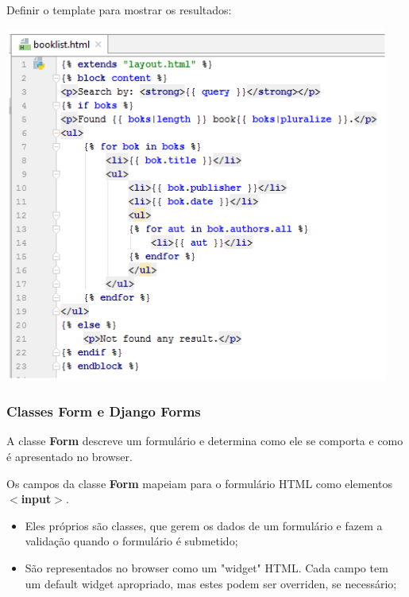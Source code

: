 \documentclass{article}
\begin{document}
\begin{flushleft}
  Definir o template para mostrar os resultados:

  \begin{center}
    \includegraphics[scale=0.35]{16}
  \end{center}
\end{flushleft}

\pagebreak

\subsubsection{Classes Form e Django Forms}

\begin{flushleft}
  A classe \textbf{Form} descreve um formulário e determina como ele se comporta
  e como é apresentado no browser.

  Os campos da classe \textbf{Form} mapeiam para o formulário HTML como elementos
  \textbf{$<$input$>$}.
  \begin{itemize}
    \item Eles próprios são classes, que gerem os dados de um formulário
    e fazem a validação quando o formulário é submetido;
    \item São representados no browser como um "widget" HTML.
    Cada campo tem um default widget apropriado, mas estes podem ser
    overriden, se necessário;
  \end{itemize}
\end{flushleft}
\end{document}
